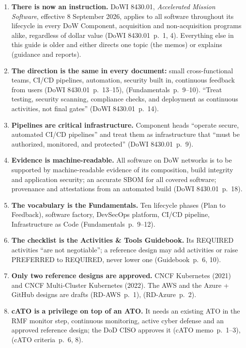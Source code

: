 \documentclass[11pt,letterpaper,twoside,openany]{memoir}
\newcommand{\pg}[2]{{\small(#1~p.~#2)}}          %
\begin{document}
{\small
\begin{enumerate}[leftmargin=1.6em,itemsep=2pt]
\item \textbf{There is now an instruction.} DoWI 8430.01, \emph{Accelerated Mission Software}, effective 8 September
  2026, applies to all software throughout its lifecycle in every DoW Component, acquisition and non-acquisition
  programs alike, regardless of dollar value \pg{DoWI 8430.01}{1, 4}. Everything else in this guide is older and
  either directs one topic (the memos) or explains (guidance and reports).
\item \textbf{The direction is the same in every document:} small cross-functional teams, CI/CD pipelines, automation,
  security built in, continuous feedback from users \pg{DoWI 8430.01}{13--15}, \pg{Fundamentals}{9--10}.
  ``Treat testing, security scanning, compliance checks, and deployment as continuous activities, not final gates''
  \pg{DoWI 8430.01}{14}.
\item \textbf{Pipelines are critical infrastructure.} Component heads ``operate secure, automated CI/CD pipelines'' and
  treat them as infrastructure that ``must be authorized, monitored, and protected'' \pg{DoWI 8430.01}{9}.
\item \textbf{Evidence is machine-readable.} All software on DoW networks is to be supported by machine-readable
  evidence of its composition, build integrity and application security; an accurate SBOM for all covered software;
  provenance and attestations from an automated build \pg{DoWI 8430.01}{18}.
\item \textbf{The vocabulary is the Fundamentals.} Ten lifecycle phases (Plan to Feedback), software factory,
  DevSecOps platform, CI/CD pipeline, Infrastructure as Code \pg{Fundamentals}{9--12}.
\item \textbf{The checklist is the Activities \& Tools Guidebook.} Its REQUIRED activities ``are not negotiable'';
  a reference design may add activities or raise PREFERRED to REQUIRED, never lower one \pg{Guidebook}{6, 10}.
\item \textbf{Only two reference designs are approved.} CNCF Kubernetes (2021) and CNCF Multi-Cluster Kubernetes
  (2022). The AWS and the Azure + GitHub designs are drafts \pg{RD-AWS}{1}, \pg{RD-Azure}{2}.
\item \textbf{cATO is a privilege on top of an ATO.} It needs an existing ATO in the RMF monitor step, continuous
  monitoring, active cyber defense and an approved reference design; the DoD CISO approves it \pg{cATO memo}{1--3},
  \pg{cATO criteria}{6, 8}.

\end{enumerate}}
\end{document}
